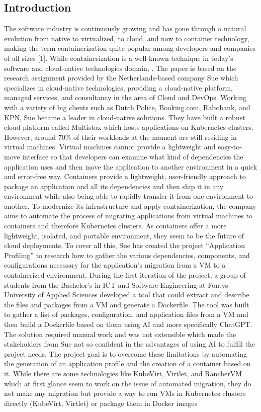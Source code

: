 \documentclass{article}
\begin{document}
\begin{multicols}{2}

\section{Introduction}
The software industry is continuously growing and has gone through a natural evolution from native to virtualized, to cloud, and now to container technology, making the term containerization quite popular among developers and companies of all sizes [1]. While containerization is a well-known technique in today's software and cloud-native technologies domain, . The paper is based on the research assignment provided by the Netherlands-based company Sue which specializes in cloud-native technologies, providing a cloud-native platform, managed services, and consultancy in the area of Cloud and DevOps. Working with a variety of big clients such as Dutch Police, Booking.com, Rabobank, and KPN, Sue became a leader in cloud-native solutions. They have built a robust cloud platform called Multistax which hosts applications on Kubernetes clusters. However, around 70\% of their workloads at the moment are still residing in virtual machines. Virtual machines cannot provide a lightweight and easy-to-move interface so that developers can examine what kind of dependencies the application uses and then move the application to another environment in a quick and error-free way. Containers provide a lightweight, user-friendly approach to package an application and all its dependencies and then ship it in any environment while also being able to rapidly transfer it from one environment to another. To modernize its infrastructure and apply containerization, the company aims to automate the process of migrating applications from virtual machines to containers and therefore Kubernetes clusters. As containers offer a more lightweight, isolated, and portable environment, they seem to be the future of cloud deployments. To cover all this, Sue has created the project “Application Profiling” to research how to gather the various dependencies, components, and configurations necessary for the application’s migration from a VM to a containerized environment. During the first iteration of the project, a group of students from the Bachelor’s in ICT and Software Engineering at Fontys University of Applied Sciences developed a tool that could extract and describe the files and packages from a VM and generate a Dockerfile. The tool was built to gather a list of packages, configuration, and application files from a VM and then build a Dockerfile based on them using AI and more specifically ChatGPT. The solution required manual work and was not extensible which made the stakeholders from Sue not so confident in the advantages of using AI to fulfill the project needs. The project goal is to overcome these limitations by automating the generation of an application profile and the creation of a container based on it. While there are some technologies like KubeVirt, Virtlet, and RancherVM which at first glance seem to work on the issue of automated migration, they do not make any migration but provide a way to run VMs in Kubernetes clusters directly (KubeVirt, Virtlet) or package them in Docker images 
\end{multicols}
\end{document}
